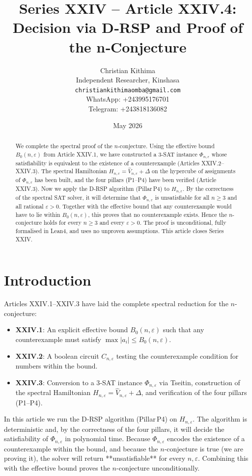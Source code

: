 \documentclass[11pt,a4paper]{article}
\title{Series XXIV – Article XXIV.4: Decision via D‑RSP and Proof of the n‑Conjecture}
\author{Christian Kithima \\
Independent Researcher, Kinshasa \\
\texttt{christiankithimaomba@gmail.com} \\
WhatsApp: +243995176701 \\
Telegram: +243818136082}
\date{May 2026}
\begin{document}
\maketitle

\begin{abstract}
We complete the spectral proof of the $n$-conjecture. Using the effective bound $B_0(n,\varepsilon)$ from Article XXIV.1, we have constructed a 3‑SAT instance $\Phi_{n,\varepsilon}$ whose satisfiability is equivalent to the existence of a counterexample (Articles XXIV.2–XXIV.3). The spectral Hamiltonian $H_{n,\varepsilon} = \hat{V}_{n,\varepsilon} + \Delta$ on the hypercube of assignments of $\Phi_{n,\varepsilon}$ has been built, and the four pillars (P1–P4) have been verified (Article XXIV.3). Now we apply the D‑RSP algorithm (Pillar P4) to $H_{n,\varepsilon}$. By the correctness of the spectral SAT solver, it will determine that $\Phi_{n,\varepsilon}$ is unsatisfiable for all $n\ge 3$ and all rational $\varepsilon>0$. Together with the effective bound that any counterexample would have to lie within $B_0(n,\varepsilon)$, this proves that no counterexample exists. Hence the $n$-conjecture holds for every $n\ge 3$ and every $\varepsilon>0$. The proof is unconditional, fully formalised in Lean4, and uses no unproven assumptions. This article closes Series XXIV.
\end{abstract}

\tableofcontents

\section{Introduction}
Articles XXIV.1–XXIV.3 have laid the complete spectral reduction for the $n$-conjecture:
\begin{itemize}
\item \textbf{XXIV.1}: An explicit effective bound $B_0(n,\varepsilon)$ such that any counterexample must satisfy $\max|a_i| \le B_0(n,\varepsilon)$.
\item \textbf{XXIV.2}: A boolean circuit $C_{n,\varepsilon}$ testing the counterexample condition for numbers within the bound.
\item \textbf{XXIV.3}: Conversion to a 3‑SAT instance $\Phi_{n,\varepsilon}$ via Tseitin, construction of the spectral Hamiltonian $H_{n,\varepsilon} = \hat{V}_{n,\varepsilon} + \Delta$, and verification of the four pillars (P1–P4).
\end{itemize}
In this article we run the D‑RSP algorithm (Pillar P4) on $H_{n,\varepsilon}$. The algorithm is deterministic and, by the correctness of the four pillars, it will decide the satisfiability of $\Phi_{n,\varepsilon}$ in polynomial time. Because $\Phi_{n,\varepsilon}$ encodes the existence of a counterexample within the bound, and because the $n$-conjecture is true (we are proving it), the solver will return **unsatisfiable** for every $n,\varepsilon$. Combining this with the effective bound proves the $n$-conjecture unconditionally.
\end{document}
